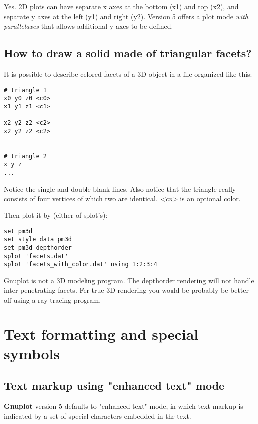 \documentclass[a4paper,11pt]{article}
\newcommand{\Gnuplot}{\textbf{Gnuplot }}
\begin{document}
Yes. 2D plots can have separate x axes at the bottom (x1) and top (x2),
and separate y axes at the left (y1) and right (y2).  Version 5 offers a
plot mode \textit{with parallelaxes} that allows additional y axes to be
defined.

\subsection{How to draw a solid made of triangular facets?}

It is possible to describe colored facets of a 3D object in a file
organized like this:
\small
\begin{verbatim}
# triangle 1
x0 y0 z0 <c0>
x1 y1 z1 <c1>

x2 y2 z2 <c2>
x2 y2 z2 <c2>


# triangle 2
x y z
...
\end{verbatim}
\normalsize

Notice the single and double blank lines. Also notice that the triangle
really consists of four vertices of which two are identical.
\textit{<cn>} is an optional color.

Then plot it by (either of splot's):
\small
\begin{verbatim}
set pm3d
set style data pm3d
set pm3d depthorder
splot 'facets.dat'
splot 'facets_with_color.dat' using 1:2:3:4
\end{verbatim}
\normalsize

Gnuplot is not a 3D modeling program.
The depthorder rendering will not handle inter-penetrating facets.
For true 3D rendering you would be probably be better off using a ray-tracing program.


\section{Text formatting and special symbols}

\subsection{Text markup using "enhanced text" mode}

\Gnuplot version 5 defaults to "enhanced text" mode, in which text markup is
indicated by a set of special characters embedded in the text.
\end{document}
